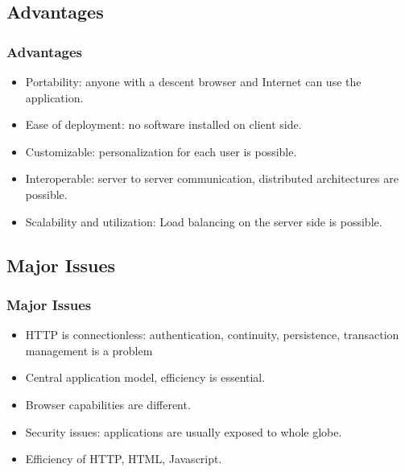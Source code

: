 \documentclass[trans,compress,xcolor=table]{beamer}
\begin{document}
\subsection{Advantages}
\begin{frame}
\frametitle{Advantages}
\begin{itemize}
\item Portability: anyone with a descent browser and Internet can use the application.
\item Ease of deployment: no software installed on client side.
\item Customizable: personalization for each user is possible.
\item Interoperable: server to server communication, distributed architectures
	are possible.
\item Scalability and utilization: Load balancing on the server side is possible.
\end{itemize}
\end{frame}

\subsection{Major Issues}
\begin{frame}
\frametitle{Major Issues}
\begin{itemize}
\item HTTP is connectionless: authentication, continuity, persistence, transaction
	management is a problem
\item Central application model, efficiency is essential.
\item Browser capabilities are different.
\item Security issues: applications are usually exposed to whole globe.
\item Efficiency of HTTP, HTML, Javascript.
\end{itemize}
\end{frame}
\end{document}
